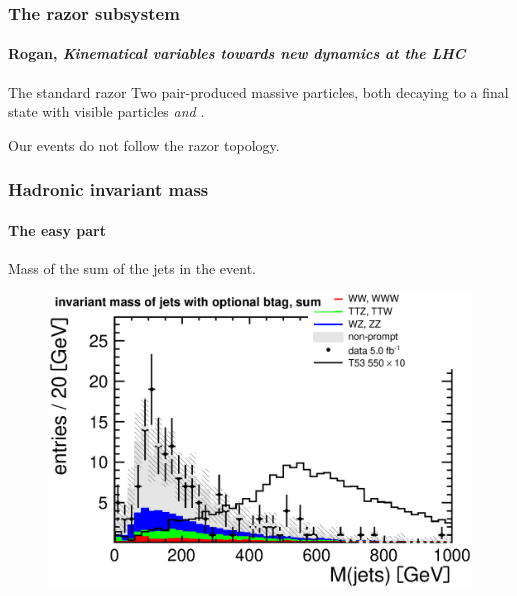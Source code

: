 \documentclass[ukenglish]{beamer}
\begin{document}
\begin{frame}
    \frametitle{The razor subsystem}
    \framesubtitle{Rogan, \emph{Kinematical variables towards new dynamics
    at the LHC}}
    \begin{block}{The standard razor}
        Two pair-produced massive particles, both decaying to a final state with
        visible particles \emph{and} \met.
    \end{block}
    \alert{Our events do not follow the razor topology.}

\end{frame}

\begin{frame}
    \frametitle{Hadronic invariant mass}
    \framesubtitle{The easy part}
    \begin{block}{}
        Mass of the sum of the jets in the event.
    \end{block}
        \begin{figure}[h]
            \centering
            \includegraphics[width=.7\textwidth]{had_mass_optional_btag_sum.eps}
        \end{figure}
\end{frame}
\end{document}
